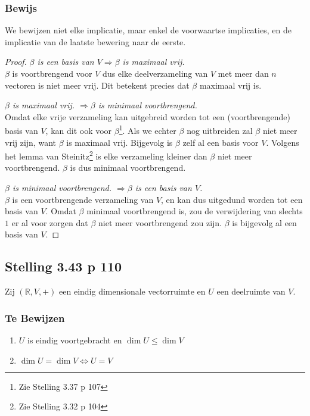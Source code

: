 \documentclass[lineaire_algebra_oplossingen.tex]{subfiles}
\begin{document}
\subsubsection*{Bewijs}
We bewijzen niet elke implicatie, maar enkel de voorwaartse implicaties, en de implicatie van de laatste bewering naar de eerste.
\begin{proof}
\item \emph{$\beta$ is een basis van $V \Rightarrow \beta$ is maximaal vrij.}\\
$\beta$ is voortbrengend voor $V$ dus elke deelverzameling van $V$ met meer dan $n$ vectoren is niet meer vrij. Dit betekent precies dat $\beta$ maximaal vrij is.
\item \emph{$\beta$ is maximaal vrij. $\Rightarrow \beta$ is minimaal voortbrengend.}\\
Omdat elke vrije verzameling kan uitgebreid worden tot een (voortbrengende) basis van $V$, kan dit ook voor $\beta$\footnote{Zie Stelling 3.37 p 107}. Als we echter $\beta$ nog uitbreiden zal $\beta$ niet meer vrij zijn, want $\beta$ is maximaal vrij. Bijgevolg is $\beta$ zelf al een basis voor $V$. Volgens het lemma van Steinitz\footnote{Zie Stelling 3.32 p 104} is elke verzameling kleiner dan $\beta$ niet meer voortbrengend. $\beta$ is dus minimaal voortbrengend.
\item \emph{$\beta$ is minimaal voortbrengend. $\Rightarrow \beta$ is een basis van $V$.}\\ $\beta$ is een voortbrengende verzameling van $V$, en kan dus uitgedund worden tot een basis van $V$. Omdat $\beta$ minimaal voortbrengend is, zou de verwijdering van slechts $1$ er al voor zorgen dat $\beta$ niet meer voortbrengend zou zijn. $\beta$ is bijgevolg al een basis van $V$.
\end{proof}


\subsection{Stelling 3.43 p 110}
\label{3.43}
Zij $(\mathbb{R},V,+)$ een eindig dimensionale vectorruimte en $U$ een deelruimte van $V$.

\subsubsection*{Te Bewijzen}
\begin{enumerate}
\item $U$ is eindig voortgebracht en $\dim U \le \dim V$
\item $\dim U=\dim V \Leftrightarrow U = V$
\end{enumerate}
\end{document}
